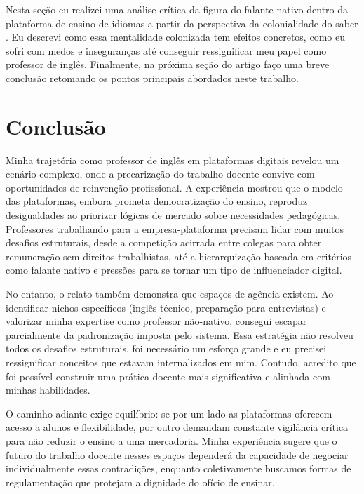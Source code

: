 \documentclass[portuguese]{textolivre}
\begin{document}
Nesta seção eu realizei uma análise crítica da figura do falante nativo dentro da plataforma de ensino de idiomas a partir da perspectiva da colonialidade do saber \cite{lander2005}. Eu descrevi como essa mentalidade colonizada tem efeitos concretos, como eu sofri com medos e inseguranças até conseguir ressignificar meu papel como professor de inglês. Finalmente, na próxima seção do artigo faço uma breve conclusão retomando os pontos principais abordados neste trabalho.

\section{Conclusão}
Minha trajetória como professor de inglês em plataformas digitais revelou um cenário complexo, onde a precarização do trabalho docente convive com oportunidades de reinvenção profissional. A experiência mostrou que o modelo das plataformas, embora prometa democratização do ensino, reproduz desigualdades ao priorizar lógicas de mercado sobre necessidades pedagógicas. Professores trabalhando para a empresa-plataforma precisam lidar com muitos desafios estruturais, desde a competição acirrada entre colegas para obter remuneração sem direitos trabalhistas, até a hierarquização baseada em critérios como falante nativo e pressões para se tornar um tipo de influenciador digital.

No entanto, o relato também demonstra que espaços de agência existem. Ao identificar nichos específicos (inglês técnico, preparação para entrevistas) e valorizar minha expertise como professor não-nativo, consegui escapar parcialmente da padronização imposta pelo sistema. Essa estratégia não resolveu todos os desafios estruturais, foi necessário um esforço grande e eu precisei ressignificar conceitos que estavam internalizados em mim. Contudo, acredito que foi possível construir uma prática docente mais significativa e alinhada com minhas habilidades.

O caminho adiante exige equilíbrio: se por um lado as plataformas oferecem acesso a alunos e flexibilidade, por outro demandam constante vigilância crítica para não reduzir o ensino a uma mercadoria. Minha experiência sugere que o futuro do trabalho docente nesses espaços dependerá da capacidade de negociar individualmente essas contradições, enquanto coletivamente buscamos formas de regulamentação que protejam a dignidade do ofício de ensinar.


\printbibliography\label{sec-bib}


\begin{dataavailability}
\end{dataavailability}
\end{document}
